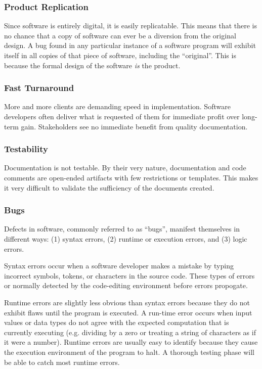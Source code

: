 \subsubsection*{Product Replication}\label{software_product}
Since software is entirely digital, it is easily replicatable. This means that
there is no chance that a copy of software can ever be a diversion from the
original design. A bug found in any particular instance of a software program
will exhibit itself in all copies of that piece of software, including the
``original''. This is because the formal design of the software \textit{is} the
product.

\subsubsection*{Fast Turnaround}

More and more clients are demanding speed in implementation. Software developers
often deliver what is requested of them for immediate profit over long-term
gain. Stakeholders see no immediate benefit from quality documentation.

\subsubsection*{Testability}

Documentation is not testable. By their very nature, documentation and code
comments are open-ended artifacts with few restrictions or templates. This makes
it very difficult to validate the sufficiency of the documents created.

\subsubsection*{Bugs}

Defects in software, commonly referred to as ``bugs'', manifest themselves in
different ways: (1) syntax errors, (2) runtime or execution errors, and (3)
logic errors.

Syntax errors occur when a software developer makes a mistake by 
typing incorrect symbols, tokens, or characters in the source code. These types
of errors or normally detected by the code-editing environment before errors
propogate.

Runtime errors are slightly less obvious than syntax errors because they do not 
exhibit flaws until the program is executed. A run-time error occurs when input
values or data types do not agree with the expected computation that is
currently executing (e.g. dividing by a zero or treating a string of characters
as if it were a number). Runtime errors are usually easy to identify because
they cause the execution environment of the program to halt. A thorough testing
phase will be able to catch most runtime errors.

